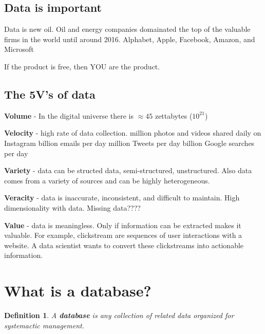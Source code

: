 \documentclass{article}
\newtheorem{definition}{Definition}
\begin{document}
\newpage


 
 \subsection*{Data is important}
\begin{outline}
    \1 Data is new oil.
        \2 Oil and energy companies domainated the top of the valuable firms in the world until around 2016.  
        \3 Alphabet, Apple, Facebook, Amazon, and Microsoft
        
    \2 If the product is free, then YOU are the product.  
    
    
\end{outline}

\subsection*{The 5V's of data}



\begin{outline}[enumerate]
        \1 \textbf{Volume} - In the digital universe there is $\approx 45$ zettabytes ($10^{21}$)

        \1 \textbf{Velocity} - high rate of data collection.
                 million photos and videos shared daily on Instagram
                 billion emails per day
                 million Tweets per day
                 billion Google searches per day
                
                
        \1 \textbf{Variety} - data can be structed data, semi-structured, unstructured.  Also data comes from a variety of sources and can be highly heterogeneous.  


        \1 \textbf{Veracity} - data is inaccurate, inconsistent, and difficult to maintain.  High dimensionality with data.  Missing data????


        \1 \textbf{Value} - data is meaningless.  Only if information can be extracted makes it valuable.  For example, clickstream are sequences of user interactions with a website.  A data scientist wants to convert these clickstreams into actionable information.  
\end{outline}






\section{What is a database?}
\begin{definition}
        A \textbf{database} is any collection of related data organized for systemactic management.
\end{definition}
\end{document}
